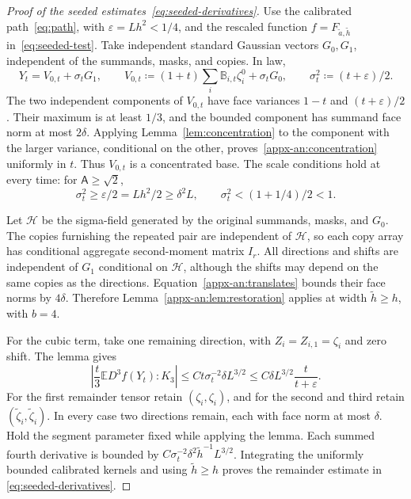 \documentclass[11pt,letterpaper]{article}
\theoremstyle{remark}
\newcommand{\E}{\mathbb E}
\begin{document}
\begin{proof}[Proof of the seeded estimates~\eqref{eq:seeded-derivatives}]
Use the calibrated path~\eqref{eq:path}, with
\(\varepsilon=Lh^2<1/4\), and the rescaled function
\(f=F_{\widetilde a,\widetilde h}\) in~\eqref{eq:seeded-test}.
Take independent standard Gaussian vectors \(G_0,G_1\), independent
of the summands, masks, and copies. In law,
\begin{equation}
 Y_t=V_{0,t}+\sigma_tG_1,\qquad
 V_{0,t}\coloneqq(1+t)\sum_i\mathbb B_{i,t}\zeta_i^0+\sigma_tG_0,
 \qquad\sigma_t^2\coloneqq(t+\varepsilon)/2.
 \label{eq:seeded-gaussian-split}
\end{equation}
The two independent components of \(V_{0,t}\) have face variances
\(1-t\) and \((t+\varepsilon)/2\). Their maximum is at least
\(1/3\), and the bounded component has summand face norm at most
\(2\delta\). Applying Lemma~\ref{lem:concentration} to the
component with the larger variance, conditional on the other,
proves~\eqref{appx-an:concentration} uniformly in \(t\).
Thus \(V_{0,t}\) is a concentrated base. The scale conditions hold
at every time: for \(\mathsf A\ge\sqrt2\),
\[
 \sigma_t^2\ge\varepsilon/2=Lh^2/2\ge\delta^2L,
 \qquad \sigma_t^2<(1+1/4)/2<1.
\]

Let \(\mathcal H\) be the sigma-field generated by the original
summands, masks, and \(G_0\). The copies furnishing the repeated
pair are independent of \(\mathcal H\), so each copy array has
conditional aggregate second-moment matrix \(I_r\). All directions
and shifts are independent of \(G_1\) conditional on
\(\mathcal H\), although the shifts may depend on the same copies as the
directions. Equation~\eqref{appx-an:translates} bounds their face
norms by \(4\delta\). Therefore Lemma~\ref{appx-an:lem:restoration}
applies at width \(\widetilde h\ge h\), with \(b=4\).

For the cubic term, take one remaining direction, with
\(Z_i=Z_{i,1}=\zeta_i\) and zero shift. The lemma gives
\[
 \left|\frac t3\E D^3f(Y_t):K_3\right|
 \le Ct\sigma_t^{-2}\delta L^{3/2}
 \le C\delta L^{3/2}\frac{t}{t+\varepsilon}.
\]
For the first remainder tensor retain \((\zeta_i,\zeta_i)\), and
for the second and third retain
\((\widetilde\zeta_i,\widetilde\zeta_i)\). In every case two
directions remain, each with face norm at most \(\delta\).
Hold the segment parameter fixed while applying the lemma. Each
summed fourth derivative is bounded by
\(C\sigma_t^{-2}\delta^2\widetilde h^{-1}L^{3/2}\).
Integrating the uniformly bounded calibrated kernels and using
\(\widetilde h\ge h\) proves the remainder estimate in
\eqref{eq:seeded-derivatives}.

\end{proof}
\end{document}
